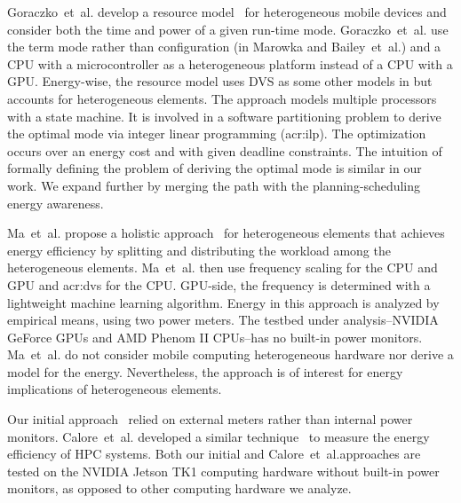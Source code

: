 Goraczko~et~al. develop a resource model~\citep{goraczko2008energy} for heterogeneous mobile devices and consider both the time and power of a given run-time mode. Goraczko~et~al. use the term mode rather than configuration (in Marowka and Bailey~et~al.) and a CPU with a microcontroller as a heterogeneous platform instead of a CPU with a GPU. Energy-wise, the resource model uses DVS as some other models in  but accounts for heterogeneous elements. The approach models multiple processors with a state machine. It is involved in a software partitioning problem to derive the optimal mode via integer linear programming (\Gls{acr:ilp}). The optimization occurs over an energy cost and with given deadline constraints. The intuition of formally defining the problem of deriving the optimal mode is similar in our work. We expand further by merging the path with the planning-scheduling energy awareness.

Ma~et~al. propose a holistic approach~\citep{ma2012holistic} for heterogeneous elements that achieves energy efficiency by splitting and distributing the workload among the heterogeneous elements. Ma~et~al. then use frequency scaling for the CPU and GPU and \Gls{acr:dvs} for the CPU. GPU-side, the frequency is determined with a lightweight machine learning algorithm. Energy in this approach is analyzed by empirical means, using two power meters. The testbed under analysis--NVIDIA GeForce GPUs and AMD Phenom II CPUs--has no built-in power monitors. Ma~et~al. do not consider mobile computing heterogeneous hardware nor derive a model for the energy. Nevertheless, the approach is of interest for energy implications of heterogeneous elements.

Our initial approach~\citep{seewald2019hlpgpu} relied on external meters rather than internal power monitors. Calore~et~al. developed a similar technique~\citep{calore2015energy} to measure the energy efficiency of HPC systems. Both our initial and Calore~et~al.approaches are tested on the NVIDIA Jetson TK1 computing hardware without built-in power monitors, as opposed to other computing hardware we analyze.

